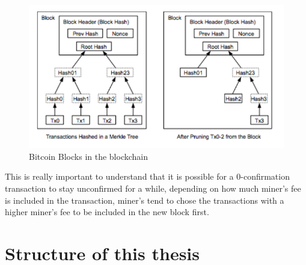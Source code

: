 \begin{figure}
\centering
\includegraphics[width=\linewidth]{fig/bitcoinblocks.png}
  \caption{Bitcoin Blocks in the blockchain}
	\source{~\cite[Nak08]}
\label{fig:bitcoinblocks}
\end{figure}

This is really important to understand that it is possible for a 0-confirmation transaction to stay unconfirmed for a while, depending on how much miner's fee is included in the transaction, miner's tend to chose the transactions with a higher miner's fee to be included in the new block first.


\section{Structure of this thesis}




